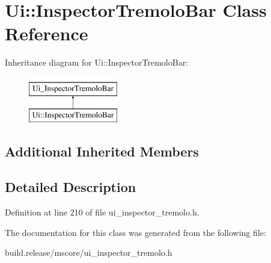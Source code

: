 \hypertarget{class_ui_1_1_inspector_tremolo_bar}{}\section{Ui\+:\+:Inspector\+Tremolo\+Bar Class Reference}
\label{class_ui_1_1_inspector_tremolo_bar}
Inheritance diagram for Ui\+:\+:Inspector\+Tremolo\+Bar\+:\begin{figure}[H]
\begin{center}
\leavevmode
\includegraphics[height=2.000000cm]{class_ui_1_1_inspector_tremolo_bar}
\end{center}
\end{figure}
\subsection*{Additional Inherited Members}


\subsection{Detailed Description}


Definition at line 210 of file ui\+\_\+inspector\+\_\+tremolo.\+h.



The documentation for this class was generated from the following file\+:\begin{DoxyCompactItemize}
\item 
build.\+release/mscore/ui\+\_\+inspector\+\_\+tremolo.\+h\end{DoxyCompactItemize}
